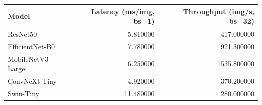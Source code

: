 \begin{tabular}{lrr}
\toprule
Model & Latency (ms/img, bs=1) & Throughput (img/s, bs=32) \\
\midrule
ResNet50 & 5.810000 & 417.000000 \\
EfficientNet-B0 & 7.780000 & 921.300000 \\
MobileNetV3-Large & 6.250000 & 1535.800000 \\
ConvNeXt-Tiny & 4.920000 & 370.200000 \\
Swin-Tiny & 11.480000 & 280.000000 \\
\bottomrule
\end{tabular}
